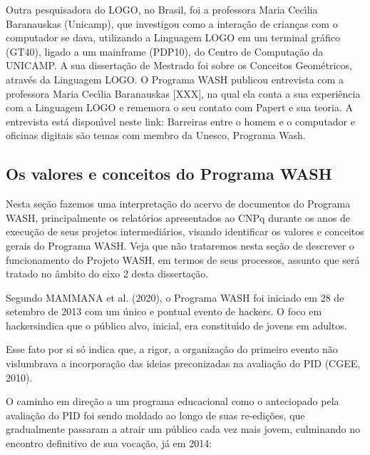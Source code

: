 \documentclass[
12pt,		%
openright,	%
twoside,  %
a4paper,			%
chapter=TITLE,		%
english,			%
french,				%
spanish,			%
brazil				%
]{USPSC-classe/USPSC}
\begin{document}
Outra pesquisadora do LOGO, no Brasil, foi a professora Maria Cec\'{\i}lia Baranauskas (Unicamp), que investigou como a intera\c{c}\~ao de crian\c{c}as com o computador se dava, utilizando a Linguagem LOGO em um terminal gr\'afico (GT40), ligado a um mainframe (PDP10), do Centro de Computa\c{c}\~ao da UNICAMP. A sua disserta\c{c}\~ao de Mestrado foi sobre os \textquotedbl Conceitos Geom\'etricos, atrav\'es da Linguagem LOGO\textquotedbl . O Programa WASH publicou entrevista com a professora Maria Cec\'{\i}lia Baranauskas [XXX], na qual ela conta a sua experi\^encia com a Linguagem LOGO e rememora o seu contato com Papert e sua teoria. A entrevista est\'a dispon\'{\i}vel neste link: \textquotedbl Barreiras entre o homem e o computador e oficinas digitais s\~ao temas com membro da Unesco, Programa Wash\textquotedbl .




\subsection[Os valores e conceitos do Programa WASH]{Os valores e conceitos do Programa WASH}\label{Os valores e conceitos do Programa WASH}
Nesta se\c{c}\~ao fazemos uma interpreta\c{c}\~ao do acervo de documentos do Programa WASH, principalmente os relat\'orios apresentados ao CNPq durante os anos de execu\c{c}\~ao de seus projetos intermedi\'arios, visando identificar os valores e conceitos gerais do Programa WASH. Veja que n\~ao trataremos nesta se\c{c}\~ao de descrever o funcionamento do Projeto WASH, em termos de seus processos, assunto que ser\'a tratado no \^ambito do eixo 2 desta disserta\c{c}\~ao.




Segundo MAMMANA et al. (2020), o Programa WASH foi iniciado em 28 de setembro de 2013 com um \textquotedbl \'unico e pontual evento de hackers\textquotedbl . O foco em \textquotedbl hackers\textquotedbl  indica que o p\'ublico alvo, inicial, era constitu\'{\i}do de jovens em adultos.




Esse fato por si s\'o indica que, a rigor, a organiza\c{c}\~ao do primeiro evento n\~ao vislumbrava a incorpora\c{c}\~ao das ideias preconizadas na avalia\c{c}\~ao do PID  (CGEE, 2010).




O caminho em dire\c{c}\~ao a um programa educacional como o anteciopado pela avalia\c{c}\~ao do PID foi sendo moldado ao longo de suas re-edi\c{c}\~oes, que gradualmente passaram a atrair um p\'ublico cada vez mais jovem, culminando no encontro definitivo de sua voca\c{c}\~ao, j\'a em 2014:
\end{document}
